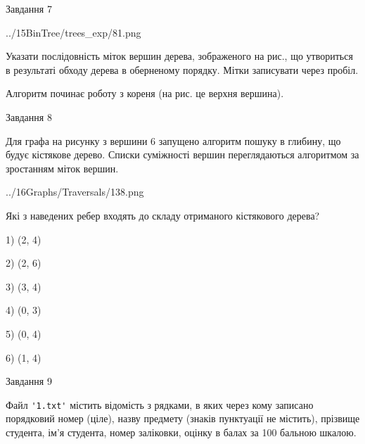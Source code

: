 \documentclass[12pt, ukrainian]{article}
\def\code#1{\Verb!#1!}
\begin{document}
{\vspace{10mm}\par

\newpage
\begin{minipage}[t]{9.7cm}
               
{\begin{center}Завдання {7}\end{center}}
\vspace{-4mm}

\begin{center}
	{../15BinTree/trees_exp/81.png}
\end{center}
Указати послідовність міток вершин дерева, зображеного на рис., що утвориться в результаті обходу дерева в оберненому порядку. Мітки записувати через пробіл.\par Алгоритм починає роботу з кореня (на рис. це верхня вершина).\par

\end{minipage}
\vline \hspace{8mm}
\begin{minipage}[t]{8.0cm}
               
{\begin{center}Завдання {8}\end{center}}
\vspace{-4mm}
Для графа на рисунку з вершини 6 запущено алгоритм пошуку в глибину, що будує кістякове дерево. Списки суміжності вершин переглядаються алгоритмом за зростанням міток вершин.\par
\begin{center}
	{../16Graphs/Traversals/138.png}
\end{center}
\par Які з наведених ребер входять до складу отриманого кістякового дерева?\par
1) (2, 4)\par
2) (2, 6)\par
3) (3, 4)\par
4) (0, 3)\par
5) (0, 4)\par
6) (1, 4)\par
{\vskip 15pt} \par

\end{minipage}

               
{\begin{center}Завдання {9}\end{center}}
\vspace{-4mm}
Файл \code{'1.txt'} містить відомість з рядками, в яких через кому записано поряд\-ковий номер (ціле), назву предмету (знаків пунктуації не містить), прізвище студента, ім'я студента, номер заліковки, оцінку в балах за 100 бальною шкалою.

}
\end{document}
